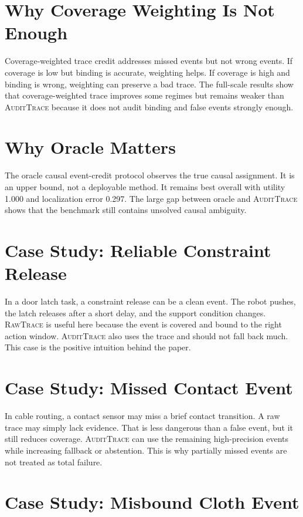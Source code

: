 \documentclass{article}
\newcommand{\method}{\textsc{AuditTrace}\xspace}
\newcommand{\rawtrace}{\textsc{RawTrace}\xspace}
\begin{document}
\section{Why Coverage Weighting Is Not Enough}

Coverage-weighted trace credit addresses missed events but not wrong events. If coverage is low but binding is accurate, weighting helps. If coverage is high and binding is wrong, weighting can preserve a bad trace. The full-scale results show that coverage-weighted trace improves some regimes but remains weaker than \method because it does not audit binding and false events strongly enough.

\section{Why Oracle Matters}

The oracle causal event-credit protocol observes the true causal assignment. It is an upper bound, not a deployable method. It remains best overall with utility 1.000 and localization error 0.297. The large gap between oracle and \method shows that the benchmark still contains unsolved causal ambiguity.

\section{Case Study: Reliable Constraint Release}

In a door latch task, a constraint release can be a clean event. The robot pushes, the latch releases after a short delay, and the support condition changes. \rawtrace is useful here because the event is covered and bound to the right action window. \method also uses the trace and should not fall back much. This case is the positive intuition behind the paper.

\section{Case Study: Missed Contact Event}

In cable routing, a contact sensor may miss a brief contact transition. A raw trace may simply lack evidence. That is less dangerous than a false event, but it still reduces coverage. \method can use the remaining high-precision events while increasing fallback or abstention. This is why partially missed events are not treated as total failure.

\section{Case Study: Misbound Cloth Event}
\end{document}
